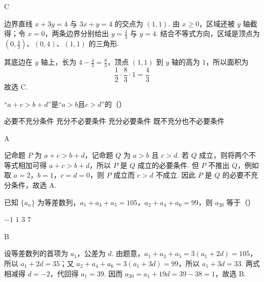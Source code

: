 \begin{answer}
C
\end{answer}

\begin{solution}
边界直线 \(x+3y=4\) 与 \(3x+y=4\) 的交点为 \((1,1)\). 由 \(x\geqslant0\)，区域还被 \(y\) 轴截得；令 \(x=0\)，两条边界分别给出 \(y=\frac{4}{3}\) 与 \(y=4\). 结合不等式方向，区域是顶点为 \((0,\frac{4}{3})\)、\((0,4)\)、\((1,1)\) 的三角形.

其底边在 \(y\) 轴上，长为 \(4-\frac{4}{3}=\frac{8}{3}\)，顶点 \((1,1)\) 到 \(y\) 轴的高为 \(1\)，所以面积为
\[
\frac{1}{2}\cdot\frac{8}{3}\cdot1=\frac{4}{3}
\]
故选 C.
\end{solution}

\begin{problem}
“\(a + c > b + d\)”是“\(a > b\)且\(c > d\)”的（\quad）

\choices
    {必要不充分条件}
    {充分不必要条件}
    {充分必要条件}
    {既不充分也不必要条件}
\end{problem}

\begin{answer}
A
\end{answer}

\begin{solution}
记命题 \(P\) 为 \(a+c>b+d\)，记命题 \(Q\) 为 \(a>b\) 且 \(c>d\). 若 \(Q\) 成立，则将两个不等式相加可得 \(a+c>b+d\)，所以 \(P\) 是 \(Q\) 成立的必要条件. 但 \(P\) 不推出 \(Q\)，例如取 \(a=2\)，\(b=1\)，\(c=d=0\)，则 \(P\) 成立而 \(c>d\) 不成立. 因此 \(P\) 是 \(Q\) 的必要不充分条件，故选 A.
\end{solution}

\begin{problem}
已知 \(\{a_{n}\}\) 为等差数列，\(a_{1} + a_{3} + a_{5} = 105\)，\(a_{2} + a_{4} + a_{6} = 99\)，则 \(a_{20}\) 等于（\quad）

\choices
    {\(-1\)}
    {\(1\)}
    {\(3\)}
    {\(7\)}
\end{problem}

\begin{answer}
B
\end{answer}

\begin{solution}
设等差数列的首项为 \(a_1\)，公差为 \(d\). 由题意，\(a_1+a_3+a_5=3(a_1+2d)=105\)，所以 \(a_1+2d=35\)；又 \(a_2+a_4+a_6=3(a_1+3d)=99\)，所以 \(a_1+3d=33\). 两式相减得 \(d=-2\)，代回得 \(a_1=39\). 因而 \(a_{20}=a_1+19d=39-38=1\)，故选 B.
\end{solution}

